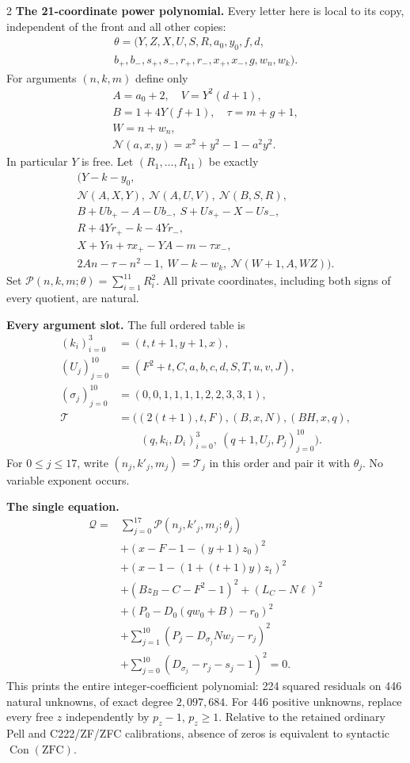 \documentclass[10pt,letterpaper]{article}
\newcommand{\PP}{\mathcal P}
\newcommand{\QQ}{\mathcal Q}
\begin{document}
\begin{multicols}{2}
\textbf{The 21-coordinate power polynomial.} Every letter here is local
to its copy, independent of the front and all other copies:
\[
\begin{gathered}
\theta=(Y,Z,X,U,S,R,a_0,y_0,f,d,\\
b_+,b_-,s_+,s_-,r_+,r_-,x_+,x_-,g,w_n,w_k).
\end{gathered}
\]
For arguments $(n,k,m)$ define only
\[
\begin{gathered}
A=a_0+2,\quad V=Y^2(d+1),\\
B=1+4Y(f+1),\quad \tau=m+g+1,\\
W=n+w_n,\\
\mathcal N(a,x,y)=x^2+y^2-1-a^2y^2.
\end{gathered}
\]
In particular $Y$ is free. Let $(R_1,\ldots,R_{11})$ be exactly
\[
\begin{gathered}
\bigl(Y-k-y_0,\\
\mathcal N(A,X,Y),\ \mathcal N(A,U,V),\ \mathcal N(B,S,R),\\
B+Ub_+-A-Ub_-,\ S+Us_+-X-Us_-,\\
R+4Yr_+-k-4Yr_-,\\
X+Yn+\tau x_+-YA-m-\tau x_-,\\
2An-\tau-n^2-1,\ W-k-w_k,\ \mathcal N(W+1,A,WZ)\bigr).
\end{gathered}
\]
Set $\PP(n,k,m;\theta)=\sum_{i=1}^{11}R_i^2$.
All private coordinates, including both signs of every quotient, are natural.

\textbf{Every argument slot.} The full ordered table is
\[
\begin{aligned}
(k_i)_{i=0}^3&=(t,t+1,y+1,x),\\
(U_j)_{j=0}^{10}&=(F^2+t,C,a,b,c,d,S,T,u,v,J),\\
(\sigma_j)_{j=0}^{10}&=(0,0,1,1,1,1,2,2,3,3,1),\\
\mathcal T&=\bigl((2(t+1),t,F),(B,x,N),(BH,x,q),\\
&\qquad(q,k_i,D_i)_{i=0}^3,\ (q+1,U_j,P_j)_{j=0}^{10}\bigr).
\end{aligned}
\]
For $0\le j\le17$, write $(n_j,k'_j,m_j)=\mathcal T_j$ in this
order and pair it with $\theta_j$. No variable exponent occurs.

\textbf{The single equation.}
\[
\boxed{\begin{aligned}
\QQ={}&\sum_{j=0}^{17}\PP(n_j,k'_j,m_j;\theta_j)\\
&+(x-F-1-(y+1)z_0)^2\\
&+(x-1-(1+(t+1)y)z_t)^2\\
&+(Bz_B-C-F^2-1)^2+(L_C-N\ell)^2\\
&+(P_0-D_0(qw_0+B)-r_0)^2\\
&+\sum_{j=1}^{10}(P_j-D_{\sigma_j}Nw_j-r_j)^2\\
&+\sum_{j=0}^{10}(D_{\sigma_j}-r_j-s_j-1)^2=0.
\end{aligned}}
\]
This prints the entire integer-coefficient polynomial: 224 squared
residuals on 446 natural unknowns, of exact degree $2{,}097{,}684$.
For 446 positive unknowns, replace every free $z$ independently by
$p_z-1$, $p_z\ge1$. Relative to the retained ordinary Pell and
C222/ZF/ZFC calibrations, absence of zeros is equivalent to syntactic
$\operatorname{Con}(\mathrm{ZFC})$.
\end{multicols}
\end{document}
